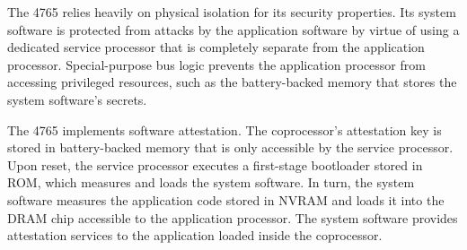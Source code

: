 The 4765 relies heavily on physical isolation for its security properties. Its
system software is protected from attacks by the application software by
virtue of using a dedicated service processor that is completely separate from
the application processor. Special-purpose bus logic prevents the application
processor from accessing privileged resources, such as the battery-backed
memory that stores the system software's secrets.

The 4765 implements software attestation. The coprocessor's attestation key is
stored in battery-backed memory that is only accessible by the service
processor. Upon reset, the service processor executes a first-stage bootloader
stored in ROM, which measures and loads the system software. In turn, the
system software measures the application code stored in NVRAM and loads it into
the DRAM chip accessible to the application processor. The system software
provides attestation services to the application loaded inside the coprocessor.
